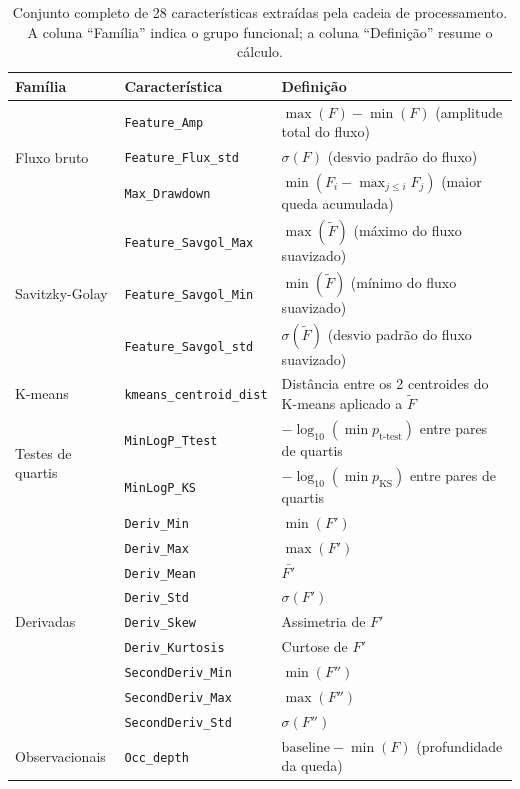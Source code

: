 \begin{table}[htbp]
\centering
\caption{Conjunto completo de 28 características extraídas pela cadeia de processamento. A coluna ``Família'' indica o grupo funcional; a coluna ``Definição'' resume o cálculo.}
\label{tab:features_completo}
\footnotesize
\begin{tabular}{llp{7.1cm}}
\hline
\textbf{Família} & \textbf{Característica} & \textbf{Definição} \\
\hline
\multirow{3}{*}{Fluxo bruto}
& \texttt{Feature\_Amp} & $\max(F) - \min(F)$ (amplitude total do fluxo) \\
& \texttt{Feature\_Flux\_std} & $\sigma(F)$ (desvio padrão do fluxo) \\
& \texttt{Max\_Drawdown} & $\min(F_i - \max_{j \le i} F_j)$ (maior queda acumulada) \\
\hline
\multirow{3}{*}{Savitzky-Golay}
& \texttt{Feature\_Savgol\_Max} & $\max(\tilde{F})$ (máximo do fluxo suavizado) \\
& \texttt{Feature\_Savgol\_Min} & $\min(\tilde{F})$ (mínimo do fluxo suavizado) \\
& \texttt{Feature\_Savgol\_std} & $\sigma(\tilde{F})$ (desvio padrão do fluxo suavizado) \\
\hline
K-means & \texttt{kmeans\_centroid\_dist} & Distância entre os 2 centroides do K-means aplicado a $\tilde{F}$ \\
\hline
\multirow{2}{*}{Testes de quartis}
& \texttt{MinLogP\_Ttest} & $-\log_{10}(\min p_{\text{t-test}})$ entre pares de quartis \\
& \texttt{MinLogP\_KS} & $-\log_{10}(\min p_{\text{KS}})$ entre pares de quartis \\
\hline
\multirow{9}{*}{Derivadas}
& \texttt{Deriv\_Min} & $\min(F')$ \\
& \texttt{Deriv\_Max} & $\max(F')$ \\
& \texttt{Deriv\_Mean} & $\bar{F'}$ \\
& \texttt{Deriv\_Std} & $\sigma(F')$ \\
& \texttt{Deriv\_Skew} & Assimetria de $F'$ \\
& \texttt{Deriv\_Kurtosis} & Curtose de $F'$ \\
& \texttt{SecondDeriv\_Min} & $\min(F'')$ \\
& \texttt{SecondDeriv\_Max} & $\max(F'')$ \\
& \texttt{SecondDeriv\_Std} & $\sigma(F'')$ \\
\hline
\multirow{10}{*}{Observacionais}
& \texttt{Occ\_depth} & $\text{baseline} - \min(F)$ (profundidade da queda) \\

\end{tabular}
\end{table}
